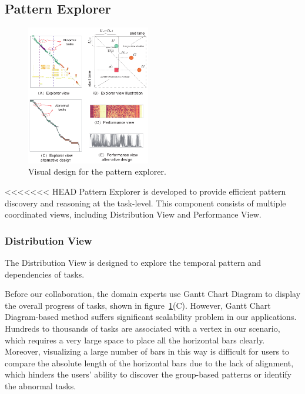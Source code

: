 \subsection{Pattern Explorer}


\begin{figure}[t]
	\centering
	\includegraphics[width=0.48\textwidth]{figures/visualization/patternexplorer.pdf}
	\vspace{-3mm}
	\caption{Visual design for the pattern explorer.}
	\label{fig:explorer}
	\vspace{-3mm}
\end{figure}


<<<<<<< HEAD
Pattern Explorer is developed to provide efficient pattern discovery and reasoning at the task-level. This component consists of multiple coordinated views, including Distribution View and Performance View.
\subsubsection{Distribution View}
The Distribution View is designed to explore the temporal pattern and dependencies of tasks.

Before our collaboration, the domain experts use Gantt Chart Diagram to display the overall progress of tasks, shown in figure~\ref{fig:explorer}(C). 
However, Gantt Chart Diagram-based method suffers significant scalability problem in our applications. Hundreds to thousands of tasks are associated with a vertex in our scenario, which requires a very large space to place all the horizontal bars clearly. 
Moreover, visualizing a large number of bars in this way is difficult for users to compare the absolute length of the horizontal bars due to the lack of alignment, which hinders the users' ability to discover the group-based patterns or identify the abnormal tasks.

